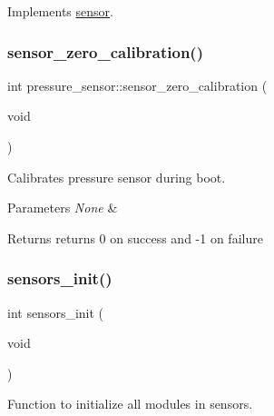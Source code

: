 Implements \hyperlink{classsensor_a71fccbf71cc771db4775443bf899a5d3}{sensor}.

\mbox{\label{group___ventilator_module_gafd69d3a07ff97d3b68bd952d5286b11a}} 
\subsubsection{\texorpdfstring{sensor\+\_\+zero\+\_\+calibration()}{sensor\_zero\_calibration()}}
{\footnotesize\ttfamily int pressure\+\_\+sensor\+::sensor\+\_\+zero\+\_\+calibration (\begin{DoxyParamCaption}\item[{void}]{ }\end{DoxyParamCaption})\hspace{0.3cm}{\ttfamily [protected]}}



Calibrates pressure sensor during boot. 


\begin{DoxyParams}{Parameters}
{\em None} & \\
\hline
\end{DoxyParams}
\begin{DoxyReturn}{Returns}
returns 0 on success and -\/1 on failure 
\end{DoxyReturn}
\mbox{\label{group___ventilator_module_ga91bed606336f32fd112a2a272bd33276}} 
\subsubsection{\texorpdfstring{sensors\+\_\+init()}{sensors\_init()}}
{\footnotesize\ttfamily int sensors\+\_\+init (\begin{DoxyParamCaption}\item[{void}]{ }\end{DoxyParamCaption})}



Function to initialize all modules in sensors. 



